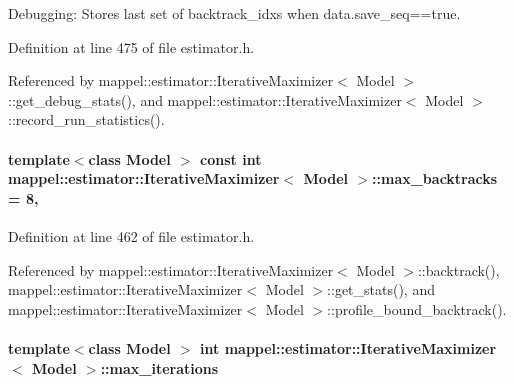 Debugging\+: Stores last set of backtrack\+\_\+idxs when data.\+save\+\_\+seq==true. 



Definition at line 475 of file estimator.\+h.



Referenced by mappel\+::estimator\+::\+Iterative\+Maximizer$<$ Model $>$\+::get\+\_\+debug\+\_\+stats(), and mappel\+::estimator\+::\+Iterative\+Maximizer$<$ Model $>$\+::record\+\_\+run\+\_\+statistics().

\paragraph[{\texorpdfstring{max\+\_\+backtracks}{max_backtracks}}]{\setlength{\rightskip}{0pt plus 5cm}template$<$class Model $>$ const int {\bf mappel\+::estimator\+::\+Iterative\+Maximizer}$<$ Model $>$\+::max\+\_\+backtracks = 8\hspace{0.3cm}{\ttfamily [static]}, {\ttfamily [protected]}}\hypertarget{classmappel_1_1estimator_1_1IterativeMaximizer_ac26f7b7965a26fa21f07732c3b1d727e}{}\label{classmappel_1_1estimator_1_1IterativeMaximizer_ac26f7b7965a26fa21f07732c3b1d727e}


Definition at line 462 of file estimator.\+h.



Referenced by mappel\+::estimator\+::\+Iterative\+Maximizer$<$ Model $>$\+::backtrack(), mappel\+::estimator\+::\+Iterative\+Maximizer$<$ Model $>$\+::get\+\_\+stats(), and mappel\+::estimator\+::\+Iterative\+Maximizer$<$ Model $>$\+::profile\+\_\+bound\+\_\+backtrack().

\paragraph[{\texorpdfstring{max\+\_\+iterations}{max_iterations}}]{\setlength{\rightskip}{0pt plus 5cm}template$<$class Model $>$ int {\bf mappel\+::estimator\+::\+Iterative\+Maximizer}$<$ Model $>$\+::max\+\_\+iterations\hspace{0.3cm}{\ttfamily [protected]}}\hypertarget{classmappel_1_1estimator_1_1IterativeMaximizer_abf5fe0b08cfbcc403c3d01511726aa38}{}\label{classmappel_1_1estimator_1_1IterativeMaximizer_abf5fe0b08cfbcc403c3d01511726aa38}


